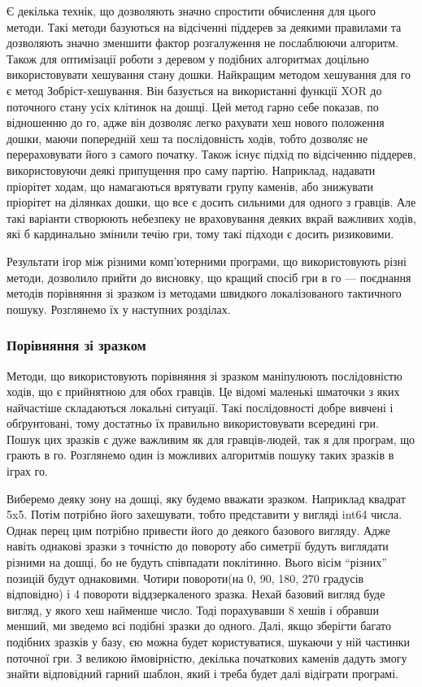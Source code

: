 Є декілька технік, що дозволяють значно спростити обчислення для цього методи. Такі методи базуються на відсіченні піддерев за деякими правилами та дозволяють значно зменшити фактор розгалуження не послаблюючи алгоритм. Також для оптимізації роботи з деревом у подібних алгоритмах доцільно використовувати хешування стану дошки. Найкращим методом хешування для го є метод Зобріст-хешування. Він базується на використанні функції XOR до поточного стану усіх клітинок на дошці. Цей метод гарно себе показав, по відношенню до го, адже він дозволяє легко рахувати хеш нового положення дошки, маючи попередній хеш та послідовність ходів, тобто дозволяє не перераховувати його з самого початку. Також існує підхід по відсіченню піддерев, використовуючи деякі припущення про саму партію. Наприклад, надавати пріорітет ходам, що намагаються врятувати групу каменів, або знижувати пріорітет на ділянках дошки, що все є досить сильними для одного з гравців. Але такі варіанти створюють небезпеку не враховування деяких вкрай важливих ходів, які б кардинально змінили течію гри, тому такі підходи є досить ризиковими.

Результати ігор між різними комп'ютерними програми, що використовують різні методи, дозволило прийти до висновку, що кращий спосіб гри в го --- поєднання методів порівняння зі зразком із методами швидкого локалізованого тактичного пошуку. Розглянемо їх у наступних розділах.
\subsubsection{Порівняння зі зразком}
Методи, що використовують порівняння зі зразком маніпулюють послідовністю ходів, що є прийнятною для обох гравців. Це відомі маленькі шматочки з яких найчастіше складаються локальні ситуації. Такі послідовності добре вивчені і обґрунтовані, тому достатньо їх правильно використовувати всередині гри. Пошук цих зразків є дуже важливим як для гравців-людей, так я для програм, що грають в го. Розглянемо один із можливих алгоритмів пошуку таких зразків в іграх го.

Виберемо деяку зону на дошці, яку будемо вважати зразком. Наприклад квадрат 5x5. Потім потрібно його захешувати, тобто представити у вигляді int64 числа. Однак перец цим потрібно привести його до деякого базового вигляду. Адже навіть однакові зразки з точністю до повороту або симетрії будуть виглядати різними на дошці, бо не будуть співпадати поклітинно. Вього вісім ``різних'' позицій будут однаковими. Чотири повороти(на 0, 90, 180, 270 градусів відповідно) і 4 повороти віддзеркаленого зразка. Нехай базовий вигляд буде вигляд, у якого хеш найменше число. Тоді порахувавши 8 хешів і обравши менший, ми зведемо всі подібні зразки до одного. Далі, якщо зберігти багато подібних зразків у базу, єю можна будет користуватися, шукаючи у ній частинки поточної гри. З великою ймовірністю, декілька початкових каменів дадуть змогу знайти відповідний гарний шаблон, який і треба будет далі відіграти програмі.

